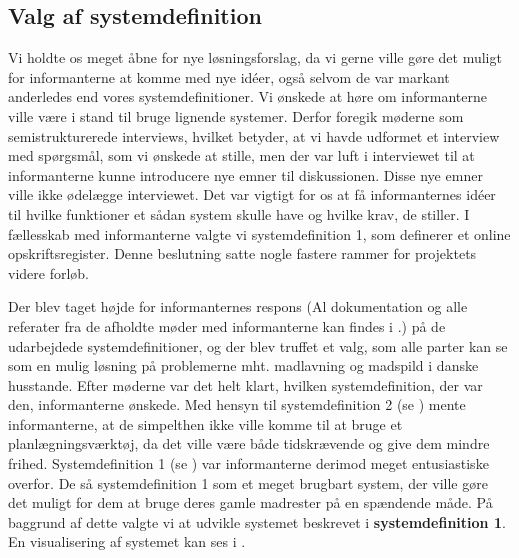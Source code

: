 \subsection{Valg af systemdefinition}
\label{subsec:valgafsystemdefinition}

Vi holdte os meget åbne for nye løsningsforslag, da vi gerne ville gøre det muligt for informanterne at komme med nye idéer, også selvom de var markant anderledes end vores systemdefinitioner. Vi ønskede at høre om informanterne ville være i stand til bruge lignende systemer. Derfor foregik møderne som semistrukturerede interviews, hvilket betyder, at vi havde udformet et interview med spørgsmål, som vi ønskede at stille, men der var luft i interviewet til at informanterne kunne introducere nye emner til diskussionen. Disse nye emner ville ikke ødelægge interviewet. Det var vigtigt for os at få informanternes idéer til hvilke funktioner et sådan system skulle have og hvilke krav, de stiller. I fællesskab med informanterne valgte vi systemdefinition 1, som definerer et online opskriftsregister. Denne beslutning satte nogle fastere rammer for projektets videre forløb. 

Der blev taget højde for informanternes respons (Al dokumentation og alle referater fra de afholdte møder med informanterne kan findes i .) på de udarbejdede systemdefinitioner, og der blev truffet et valg, som alle parter kan se som en mulig løsning på problemerne mht. madlavning og madspild i danske husstande. Efter møderne var det helt klart, hvilken systemdefinition, der var den, informanterne ønskede. Med hensyn til systemdefinition 2 (se ) mente informanterne, at de simpelthen ikke ville komme til at bruge et planlægningsværktøj, da det ville være både tidskrævende og give dem mindre frihed. Systemdefinition 1 (se ) var informanterne derimod meget entusiastiske overfor. De så systemdefinition 1 som et meget brugbart system, der ville gøre det muligt for dem at bruge deres gamle madrester på en spændende måde. På baggrund af dette valgte vi at udvikle systemet beskrevet i \textbf{systemdefinition 1}. En visualisering af systemet kan ses i .

